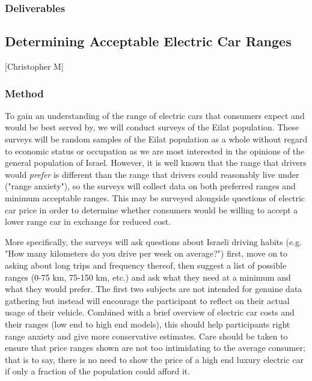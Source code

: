 \documentclass{article}                         %
\begin{document}
\subsubsection{Deliverables}


\subsection{Determining Acceptable Electric Car Ranges}[Christopher M]
\subsubsection{Method}
To gain an understanding of the range of electric cars that consumers expect and would be best served by, we will conduct surveys of the Eilat population. These surveys will be random samples of the Eilat population as a whole without regard to economic status or occupation as we are most interested in the opinions of the general population of Israel. However, it is well known that the range that drivers would \textit{prefer} is different than the range that drivers could reasonably live under ("range anxiety"), so the surveys will collect data on both preferred ranges and minimum acceptable ranges. This may be surveyed alongside questions of electric car price in order to determine whether consumers would be willing to accept a lower range car in exchange for reduced cost.

More specifically, the surveys will ask questions about Israeli driving habits (e.g. "How many kilometers do you drive per week on average?") first, move on to asking about long trips and frequency thereof, then suggest a list of possible ranges (0-75 km, 75-150 km, etc.) and ask what they need at a minimum and what they would prefer. The first two subjects are not intended for genuine data gathering but instead will encourage the participant to reflect on their actual usage of their vehicle. Combined with a brief overview of electric car costs and their ranges (low end to high end models), this should help participants right range anxiety and give more conservative estimates. Care should be taken to ensure that price ranges shown are not too intimidating to the average consumer; that is to say, there is no need to show the price of a high end luxury electric car if only a fraction of the population could afford it.
\end{document}
